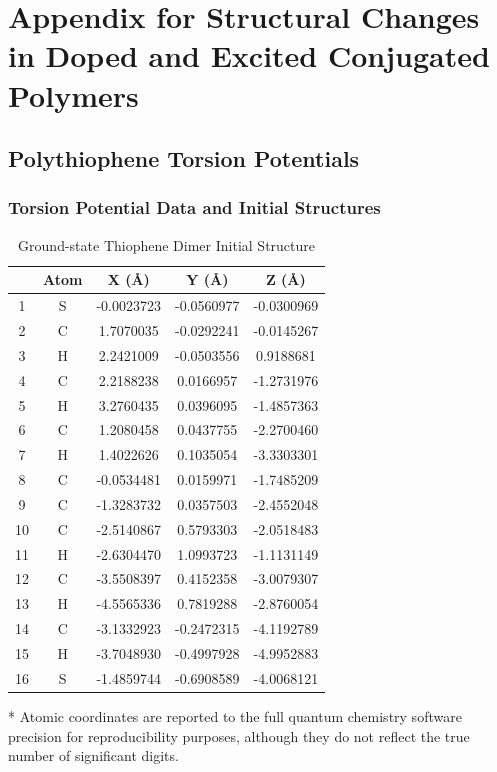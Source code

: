 %
\chapter{Appendix for Structural Changes in Doped and Excited Conjugated Polymers}\label{append:tor_model}

\clearpage

\section{Polythiophene Torsion Potentials}
\label{sec:pt_tp}
\subsection{Torsion Potential Data and Initial Structures}
\begin{table}[hbt!]\centering
\caption{Ground-state Thiophene Dimer Initial Structure}
\renewcommand{\arraystretch}{1.5}
\begin{threeparttable}
\begin{tabular}{ccccc}\toprule
{} & {Atom} & {X (\AA)} & {Y (\AA)} & {Z (\AA)} \\ \midrule
  1 & S & -0.0023723 & -0.0560977 & -0.0300969\\
  2 & C & 1.7070035 & -0.0292241 & -0.0145267\\
  3 & H & 2.2421009 & -0.0503556 & 0.9188681\\
  4 & C & 2.2188238 & 0.0166957 & -1.2731976\\
  5 & H & 3.2760435 & 0.0396095 & -1.4857363\\
  6 & C & 1.2080458 & 0.0437755 & -2.2700460\\
  7 & H & 1.4022626 & 0.1035054 & -3.3303301\\
  8 & C & -0.0534481 & 0.0159971 & -1.7485209\\
  9 & C & -1.3283732 & 0.0357503 & -2.4552048\\
  10 & C & -2.5140867 & 0.5793303 & -2.0518483\\
  11 & H & -2.6304470 & 1.0993723 & -1.1131149\\
  12 & C & -3.5508397 & 0.4152358 & -3.0079307\\
  13 & H & -4.5565336 & 0.7819288 & -2.8760054\\
  14 & C & -3.1332923 & -0.2472315 & -4.1192789\\
  15 & H & -3.7048930 & -0.4997928 & -4.9952883\\
  16 & S & -1.4859744 & -0.6908589 & -4.0068121\\ \bottomrule
\end{tabular}
\begin{tablenotes}
\item[*] \footnotesize Atomic coordinates are reported to the full quantum chemistry software precision for reproducibility purposes, although they do not reflect the true number of significant digits.
\end{tablenotes}
\end{threeparttable}
\end{table}

